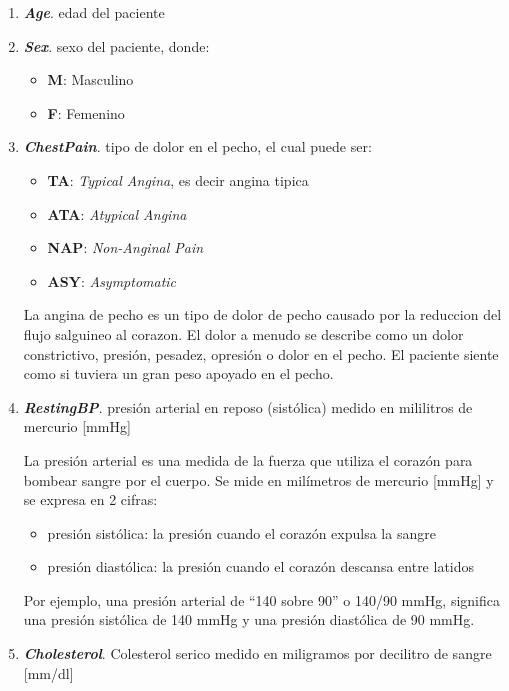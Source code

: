 \documentclass[12pt, letterpaper]{article}
\begin{document}
\begin{enumerate}
    \item{\textbf{\textit{Age}}. edad del paciente} 
    \item{\textbf{\textit{Sex}}. sexo del paciente, donde:
    \begin{itemize}
        \item{\textbf{M}}: Masculino
        \item{\textbf{F}}: Femenino
    \end{itemize}
    }
    \item{\textbf{\textit{ChestPain}}. tipo de dolor en el pecho, el cual puede ser: 
    \begin{itemize}
        \item{\textbf{TA}}: \textit{Typical Angina}, es decir angina tipica
        \item{\textbf{ATA}}: \textit{Atypical Angina}
        \item{\textbf{NAP}}: \textit{Non-Anginal Pain}
        \item{\textbf{ASY}}: \textit{Asymptomatic}
    \end{itemize}
    La angina de pecho es un tipo de dolor de pecho causado por la reduccion del flujo
    salguineo al corazon. El dolor a menudo se describe como un dolor constrictivo, 
    presión, pesadez, opresión o dolor en el pecho. El paciente siente como si tuviera
    un gran peso apoyado en el pecho. \cite{angina}
    }
    \item{\textbf{\textit{RestingBP}}. presión arterial en reposo (sistólica)
    medido en mililitros de mercurio [mmHg]
    
    La presión arterial es una medida de la fuerza que utiliza el corazón para bombear
    sangre por el cuerpo. Se mide en milímetros de mercurio [mmHg] y se expresa en 2 cifras:
    \begin{itemize}
        \item{presión sistólica: la presión cuando el corazón expulsa la sangre}
        \item{presión diastólica: la presión cuando el corazón descansa entre latidos}
    \end{itemize}
    Por ejemplo, una presión arterial de \textquotedblleft{}140 sobre 90\textquotedblright{}
    o 140/90 mmHg, significa una presión sistólica de 140 mmHg y una presión diastólica
    de 90 mmHg. \cite{presion-arterial}
    }
    \item{\textbf{\textit{Cholesterol}}. Colesterol serico 
    medido en miligramos por decilitro de sangre [mm/dl]
    
}
\end{enumerate}
\end{document}
